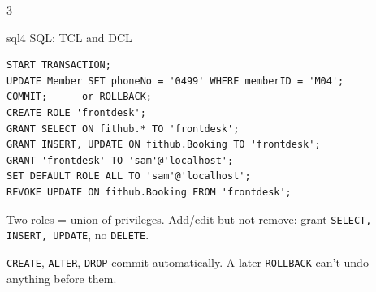 \documentclass[9pt]{extarticle}
\newcommand{\code}[1]{\texttt{\small #1}}
\begin{document}
\begin{multicols*}{3}
\begin{topic}{sql}{4 \quad SQL: TCL and DCL}
\begin{lstlisting}
START TRANSACTION;
UPDATE Member SET phoneNo = '0499' WHERE memberID = 'M04';
COMMIT;   -- or ROLLBACK;
CREATE ROLE 'frontdesk';
GRANT SELECT ON fithub.* TO 'frontdesk';
GRANT INSERT, UPDATE ON fithub.Booking TO 'frontdesk';
GRANT 'frontdesk' TO 'sam'@'localhost';
SET DEFAULT ROLE ALL TO 'sam'@'localhost';
REVOKE UPDATE ON fithub.Booking FROM 'frontdesk';
\end{lstlisting}
Two roles = union of privileges. Add/edit but not remove: grant \code{SELECT, INSERT, UPDATE}, no \code{DELETE}.
\begin{trap}
\code{CREATE}, \code{ALTER}, \code{DROP} commit automatically. A later \code{ROLLBACK} can't undo anything before them.
\end{trap}
\end{topic}

\end{multicols*}
\end{document}
